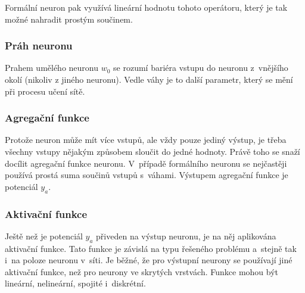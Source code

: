 \documentclass[a4paper,12pt]{article}
\begin{document}
{{{{Formální neuron pak využívá lineární hodnotu tohoto operátoru, který je tak možné nahradit prostým součinem.~\cite{nn}


\subsubsection{Práh neuronu}

Prahem umělého neuronu $w_0$ se rozumí bariéra vstupu do neuronu z~vnějšího okolí (nikoliv z jiného neuronu). Vedle váhy je to další parametr, který se mění při procesu učení sítě.~\cite{nn}

\subsubsection{Agregační funkce}

Protože neuron může mít více vstupů, ale vždy pouze jediný výstup, je třeba všechny vstupy nějakým způsobem sloučit do jedné hodnoty. Právě toho se snaží docílit agregační funkce neuronu. V~případě formálního neuronu se nejčastěji používá prostá suma součinů vstupů s~váhami. Výstupem agregační funkce je potenciál $y_a$.~\cite{nn}


\subsubsection{Aktivační funkce}

Ještě než je potenciál $y_a$ přiveden na výstup neuronu, je na něj aplikována aktivační funkce. Tato funkce je závislá na typu řešeného problému a~stejně tak i~na poloze neuronu v~síti. Je běžné, že pro výstupní neurony se používají jiné aktivační funkce, než pro neurony ve skrytých vrstvách. Funkce mohou být lineární, nelineární, spojité i~diskrétní.~\cite{nn}





}}}}
\end{document}
